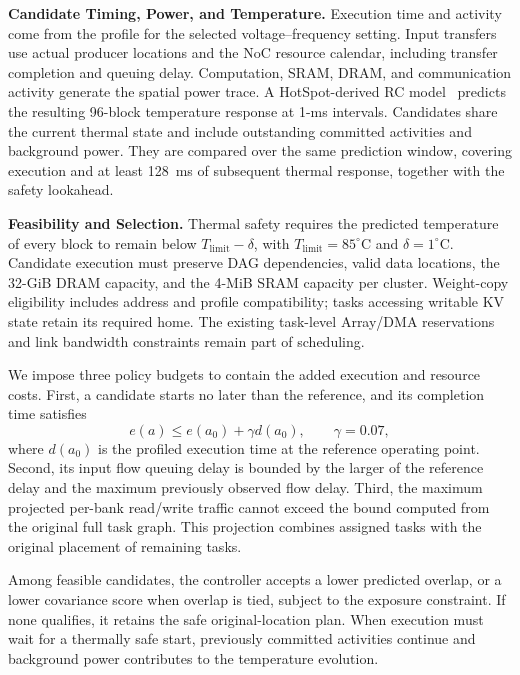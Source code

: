\documentclass[conference,10pt]{IEEEtran}
\begin{document}
\noindent\textbf{Candidate Timing, Power, and Temperature.}
Execution time and activity come from the profile for the selected
voltage--frequency setting. Input transfers use actual producer locations
and the NoC resource calendar, including transfer completion and queuing
delay. Computation, SRAM, DRAM, and communication activity generate
the spatial power trace. A HotSpot-derived RC model~\cite{hotspot_tool}
predicts the resulting 96-block temperature response at 1-ms intervals.
Candidates share the current thermal state and include outstanding
committed activities and background power. They are compared over
the same prediction window, covering execution and at least
128~ms of subsequent thermal response, together with the safety
lookahead.

\noindent\textbf{Feasibility and Selection.}
Thermal safety requires the predicted temperature of every block to
remain below $T_{\mathrm{limit}}-\delta$, with
$T_{\mathrm{limit}}=85^\circ$C and $\delta=1^\circ$C.
Candidate execution must preserve DAG dependencies, valid data
locations, the 32-GiB DRAM capacity, and the 4-MiB SRAM capacity per
cluster. Weight-copy eligibility includes address and profile compatibility;
tasks accessing writable KV state retain its required home.
The existing task-level Array/DMA reservations and link bandwidth
constraints remain part of scheduling.

We impose three policy budgets to contain the added execution and
resource costs. First, a candidate starts no later than the reference,
and its completion time satisfies
\begin{equation}
  e(a)\leq e(a_0)+\gamma d(a_0),\qquad \gamma=0.07,
  \label{eq:thermal-latency-budget}
\end{equation}
where $d(a_0)$ is the profiled execution time at the reference
operating point. Second, its input flow queuing delay is bounded
by the larger of the reference delay and the maximum previously
observed flow delay. Third, the maximum projected per-bank read/write
traffic cannot exceed the bound computed from the original full task
graph. This projection combines assigned tasks with the original
placement of remaining tasks.

Among feasible candidates, the controller accepts a lower predicted
overlap, or a lower covariance score when overlap is tied, subject to
the exposure constraint. If none qualifies, it retains the safe
original-location plan. When execution must wait for a thermally safe
start, previously committed activities continue and background power
contributes to the temperature evolution.
\end{document}
